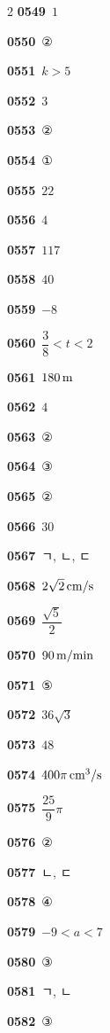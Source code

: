 \documentclass[10pt,a4paper]{article}
\begin{document}
\begin{multicols}{2}
\noindent\textbf{0549}\ $1$\par
\noindent\textbf{0550}\ ②\par
\noindent\textbf{0551}\ $k>5$\par
\noindent\textbf{0552}\ $3$\par
\noindent\textbf{0553}\ ②\par
\noindent\textbf{0554}\ ①\par
\noindent\textbf{0555}\ $22$\par
\noindent\textbf{0556}\ $4$\par
\noindent\textbf{0557}\ $117$\par
\noindent\textbf{0558}\ $40$\par
\noindent\textbf{0559}\ $-8$\par
\noindent\textbf{0560}\ $\dfrac{3}{8}<t<2$\par
\noindent\textbf{0561}\ $180\mkern3mu \mathrm{m}$\par
\noindent\textbf{0562}\ $4$\par
\noindent\textbf{0563}\ ②\par
\noindent\textbf{0564}\ ③\par
\noindent\textbf{0565}\ ②\par
\noindent\textbf{0566}\ $30$\par
\noindent\textbf{0567}\ ㄱ, ㄴ, ㄷ\par
\noindent\textbf{0568}\ $2\sqrt{2}\mkern3mu \mathrm{cm/s}$\par
\noindent\textbf{0569}\ $\dfrac{\sqrt{5}}{2}$\par
\noindent\textbf{0570}\ $90\mkern3mu \mathrm{m/min}$\par
\noindent\textbf{0571}\ ⑤\par
\noindent\textbf{0572}\ $36\sqrt{3}$\par
\noindent\textbf{0573}\ $48$\par
\noindent\textbf{0574}\ $400\pi\mkern3mu \mathrm{cm}^3/\mathrm{s}$\par
\noindent\textbf{0575}\ $\dfrac{25}{9}\pi$\par
\noindent\textbf{0576}\ ②\par
\noindent\textbf{0577}\ ㄴ, ㄷ\par
\noindent\textbf{0578}\ ④\par
\noindent\textbf{0579}\ $-9<a<7$\par
\noindent\textbf{0580}\ ③\par
\noindent\textbf{0581}\ ㄱ, ㄴ\par
\noindent\textbf{0582}\ ③\par

\end{multicols}
\end{document}
